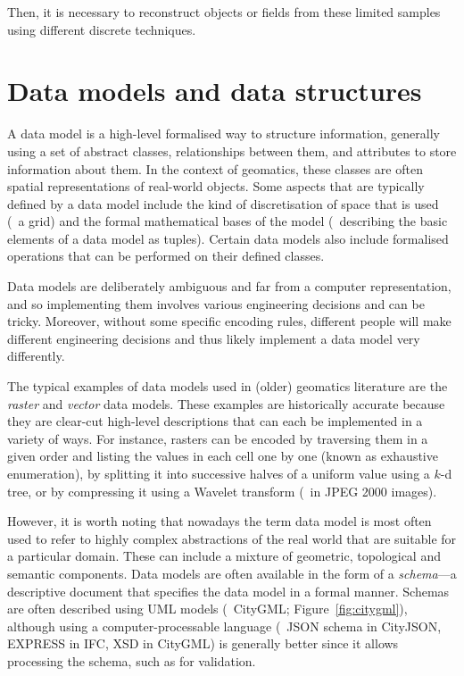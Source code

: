 Then, it is necessary to reconstruct objects or fields from these limited samples using different discrete techniques.

\section{Data models and data structures}

A data model is a high-level formalised way to structure information, generally using a set of abstract classes, relationships between them, and attributes to store information about them.
In the context of geomatics, these classes are often spatial representations of real-world objects.
Some aspects that are typically defined by a data model include the kind of discretisation of space that is used (\eg\ a grid) and the formal mathematical bases of the model (\eg\ describing the basic elements of a data model as tuples).
Certain data models also include formalised operations that can be performed on their defined classes.

Data models are deliberately ambiguous and far from a computer representation, and so implementing them involves various engineering decisions and can be tricky.
Moreover, without some specific encoding rules, different people will make different engineering decisions and thus likely implement a data model very differently.

The typical examples of data models used in (older) geomatics literature are the \emph{raster} and \emph{vector} data models.
These examples are historically accurate because they are clear-cut high-level descriptions that can each be implemented in a variety of ways.
For instance, rasters can be encoded by traversing them in a given order and listing the values in each cell one by one (known as exhaustive enumeration), by splitting it into successive halves of a uniform value using a $k$-d tree, or by compressing it using a Wavelet transform (\eg\ in JPEG 2000 images).

However, it is worth noting that nowadays the term data model is most often used to refer to highly complex abstractions of the real world that are suitable for a particular domain.
These can include a mixture of geometric, topological and semantic components.
Data models are often available in the form of a \emph{schema}---a descriptive document that specifies the data model in a formal manner.
Schemas are often described using UML models (\eg\ CityGML; Figure~\ref{fig:citygml}), although using a computer-processable language (\eg\ JSON schema in CityJSON, EXPRESS in IFC, XSD in CityGML) is generally better since it allows processing the schema, such as for validation.

